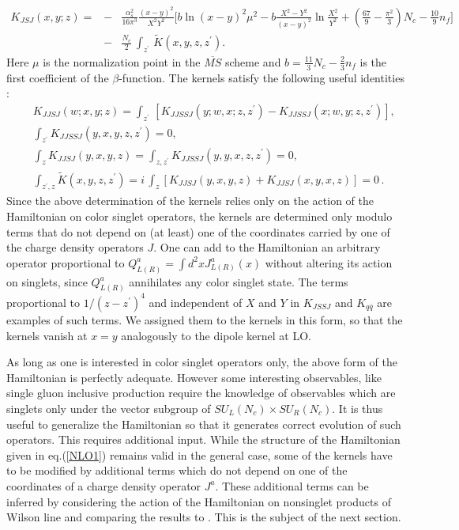 \documentclass[11pt,a4paper]{article}
\def\beq{\begin{equation}}
\def\eeq{\end{equation}}
\def\beq{\begin{equation}}
\def\eeq{\end{equation}}
\begin{document}
\begin{eqnarray}\label{KJSJ}
K_{JSJ}(x,y;z) =&-&\frac{\alpha_s^2}{16 \pi^3}
\frac{(x-y)^2}{X^2 Y^2}\Big[b\ln(x-y)^2\mu^2
-b\frac{X^2-Y^2}{ (x-y)^2}\ln\frac{X^2}{Y^2}+
(\frac{67}{9}-\frac{\pi^2}{ 3})N_c-\frac{10}{ 9}n_f\Big]\nonumber \\
&-& \frac{N_c}{2}\ \int_{z^\prime}\, \tilde K(x,y,z,z^\prime).
\end{eqnarray}
Here $\mu$ is the normalization point in the $\overline{MS}$ scheme and
$b=\frac{11}{3}N_c-\frac{2}{3}n_f$ is the first coefficient of the $\beta$-function.
The kernels satisfy the following useful identities \cite{BClast}:
\begin{eqnarray}\label{Krelate}
&&K_{JJSJ}(w;x,y;z)=
  \int_{z^\prime}\, \left[K_{JJSSJ}(y;w,x;z,z^\prime)-K_{JJSSJ}(x;w,y;z,z^\prime)\right],\nonumber \\
&&\int_{z^\prime}K_{JJSSJ}(y,x,y,z,z^{\prime})=0,\nonumber \\
 && \int_{z}K_{JJSJ}(y,x,y,z)=\int_{z,z^{\prime}}K_{JJSSJ}(y,y,x,z,z^{\prime})=0,\nonumber \\
&& \int_{z^{\prime},z}\widetilde{K}(x,y,z,z^{\prime})=i\, \int_z\left[K_{JJSJ}(y,x,y,z)+K_{JJSJ}(x,y,x,z)\right]=0\,.
\end{eqnarray}
Since the above determination of the kernels relies only on the action of the Hamiltonian on color singlet operators, the kernels 
are determined only modulo terms that do not depend on (at least) one of the coordinates carried by one of the charge density operators $J$. 
One can add to the Hamiltonian an arbitrary operator proportional to $Q_{L(R)}^a=\int d^2x J_{L(R)}^a(x)$ without altering its action on singlets, since $Q^a_{L(R)}$ annihilates any color singlet state.  The terms proportional to $1/ (z-z^\prime)^4$ and independent of $X$ and $Y$ in $K_{JSSJ}$ and $K_{q\bar q}$  are  examples of such terms. We assigned them to the kernels in this form, so that the kernels vanish at $x=y$ analogously to the dipole kernel at LO.  

As long as one is interested in color singlet operators only, the above form of the Hamiltonian is perfectly adequate. However some interesting observables, like single gluon inclusive production require the knowledge of observables which are singlets only under the vector subgroup of $SU_L(N_c)\times SU_R(N_c)$\cite{tolga}. It is thus useful to generalize the Hamiltonian so that it generates correct evolution of such operators.
This requires additional input. While the structure of the Hamiltonian given in eq.(\ref{NLO1}) remains valid in the general case, some of the kernels have to be modified by additional terms which do not depend on one of the coordinates of a charge density operator $J^a$.
These additional terms can be inferred by considering the action of the Hamiltonian on nonsinglet products of Wilson line and comparing the results to \cite{BClast}.  This is the subject of the next section.
\end{document}
